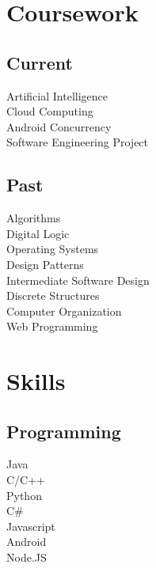 \documentclass[letterpaper]{deedy-resume} %
\begin{document}
\begin{minipage}[t]{0.33\textwidth}
\sectionspace %


\section{Coursework}

\subsection{Current}

Artificial Intelligence \\
Cloud Computing \\
Android Concurrency \\
Software Engineering Project\\

\sectionspace %


\subsection{Past}

Algorithms \\
Digital Logic \\
Operating Systems \\
Design Patterns \\
Intermediate Software Design \\
Discrete Structures \\
Computer Organization \\
Web Programming \\

\sectionspace %


\section{Skills}

\subsection{Programming}

Java \\
C/C++ \\
Python \\
C\# \\
Javascript \\
Android \\
Node.JS \\
\sectionspace %


\end{minipage} %
\end{document}
